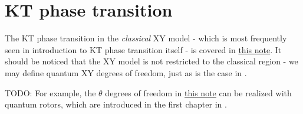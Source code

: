 \documentclass[hyperref, a4paper]{article}
\newcommand{\ktnote}{\href{../topological-phases-reading-notes/kt.pdf}{this note}}
\begin{document}
\section{KT phase transition}

The KT phase transition in the \emph{classical} XY model - which is most frequently 
seen in introduction to KT phase transition itself - is covered in \ktnote. It should be noticed that the 
XY model is not restricted to the classical region - we may define quantum XY degrees of freedom, just as
is the case in . 

TODO: For example, the $\theta$ degrees of freedom in \ktnote{} can be realized with quantum rotors, which are 
introduced in the first chapter in \cite{Sachdev2009}. 


 
\end{document}
